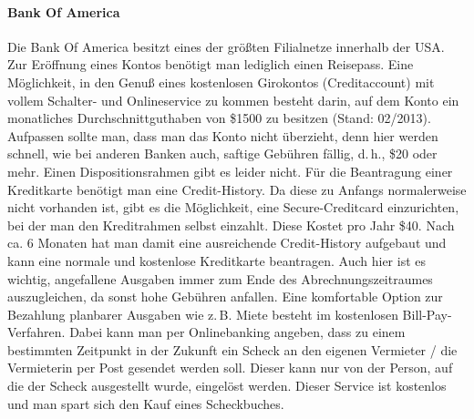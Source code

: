 \documentclass[a4paper]{scrreprt}
\begin{document}
\paragraph{Bank Of America}  %
Die Bank Of America besitzt eines der gr\"o\ss{}ten Filialnetze innerhalb der USA. Zur Er\"offnung eines Kontos ben\"otigt man lediglich einen Reisepass. Eine M\"oglichkeit, in den Genu\ss{} eines kostenlosen Girokontos (Creditaccount) mit vollem Schalter- und Onlineservice zu kommen besteht darin, auf dem Konto ein monatliches Durchschnittguthaben von \$1500 zu besitzen (Stand: 02/2013). Aufpassen sollte man, dass man das Konto nicht \"uberzieht, denn hier werden schnell, wie bei anderen Banken auch, saftige Geb\"uhren f\"allig, d.\,h., \$20  oder mehr. Einen Dispositionsrahmen gibt es leider nicht. F\"ur die Beantragung einer Kreditkarte ben\"otigt man eine Credit-History. Da diese zu Anfangs normalerweise nicht vorhanden ist, gibt es die M\"oglichkeit, eine Secure-Creditcard einzurichten, bei der man den Kreditrahmen selbst einzahlt. Diese Kostet pro Jahr \$40. Nach ca. 6 Monaten hat man damit eine ausreichende Credit-History aufgebaut und kann eine normale und kostenlose Kreditkarte beantragen. Auch hier ist es wichtig, angefallene Ausgaben immer zum Ende des Abrechnungszeitraumes auszugleichen, da sonst hohe Geb\"uhren anfallen.
Eine komfortable Option zur Bezahlung planbarer Ausgaben wie z.\,B. Miete besteht im kostenlosen Bill-Pay-Verfahren. Dabei kann man per Onlinebanking angeben, dass zu einem bestimmten Zeitpunkt in der Zukunft ein Scheck an den eigenen Vermieter / die Vermieterin per Post gesendet werden soll. Dieser kann nur von der Person, auf die der Scheck ausgestellt wurde, eingel\"ost werden. Dieser Service ist kostenlos und man spart sich den Kauf eines Scheckbuches.

\end{document}
